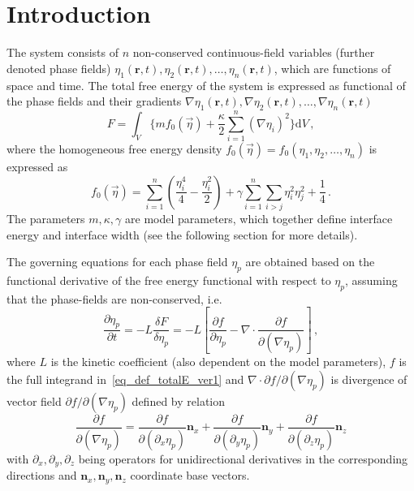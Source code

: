 \section{Introduction}
The system consists of $n$ non-conserved continuous-field variables (further denoted phase fields) $\eta_1(\mathbf{r},t), \eta_2(\mathbf{r},t),\dots,\eta_n(\mathbf{r},t)$, which are functions of space and time. The total free energy of the system is expressed as functional of the phase fields and their gradients $\nabla\eta_1(\mathbf{r},t), \nabla\eta_2(\mathbf{r},t),\dots,\nabla\eta_n(\mathbf{r},t)$
\begin{equation} \label{eq_def_totalE_ver1}
	F = \int_V \Bigg\{ m f_0(\vec{\eta}) + \frac{\kappa}{2}\sum_{i=1}^n(\nabla \eta_i)^2 \Bigg\} \mathrm{d}V \,,
\end{equation}
where the homogeneous free energy density $f_0(\vec{\eta}) = f_0(\eta_1, \eta_2,\dots,\eta_n)$ is expressed as 
\begin{equation}
	f_0(\vec{\eta}) = \sum_{i=1}^n\left(\frac{\eta_i^4}{4} - \frac{\eta_i^2}{2} \right) +\gamma\sum_{i=1}^n\sum_{i>j}\eta_i^2\eta_j^2 + \frac{1}{4} \,.
\end{equation}
The parameters $m,\kappa, \gamma$ are model parameters, which together define interface energy and interface width (see the following section for more details).

The governing equations for each phase field $\eta_p$ are obtained based on the  functional derivative of the free energy functional with respect to $\eta_p$, assuming that the phase-fields are non-conserved, i.e. %
\begin{equation}
	\label{eq_ACeq_governing}
	\frac{\partial \eta_p}{\partial t} = -L\frac{\delta F}{\delta \eta_p} = -L \left[ \frac{\partial f}{\partial \eta_p} - \nabla\cdot\frac{\partial f}{\partial(\nabla \eta_p)} \right] \,,
\end{equation}
where $L$ is the kinetic coefficient (also dependent on the model parameters), $f$ is the full integrand in~\eqref{eq_def_totalE_ver1} and $\nabla\cdot\partial f/\partial(\nabla \eta_p)$ is divergence of vector field $\partial f/\partial(\nabla \eta_p)$ defined by relation
\begin{equation}
	\frac{\partial f}{\partial(\nabla \eta_p)} = \frac{\partial f}{\partial(\partial_x\eta_p)}\mathbf{n}_x + \frac{\partial f}{\partial(\partial_y \eta_p)}\mathbf{n}_y + \frac{\partial f}{\partial(\partial_z \eta_p)}\mathbf{n}_z
\end{equation}
with $\partial_x,\partial_y,\partial_z$ being operators for unidirectional derivatives in the corresponding directions and $\mathbf{n}_x,\mathbf{n}_y,\mathbf{n}_z$ coordinate base vectors. 


